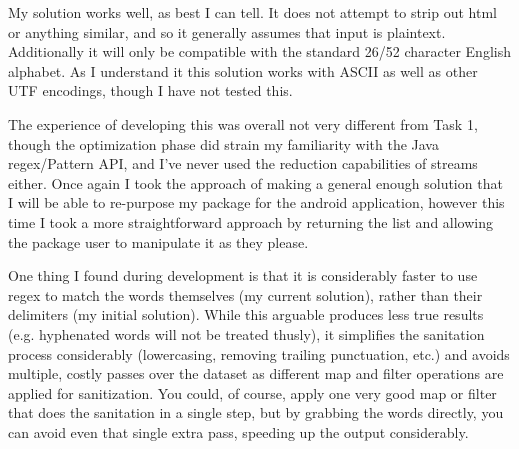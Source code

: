 \documentclass[11pt]{article}
\begin{document}
My solution works well, as best I can tell. It does not attempt to strip out html or anything similar, and so it generally assumes that input is plaintext. Additionally it will only be compatible with the standard 26/52 character English alphabet. As I understand it this solution works with ASCII as well as other UTF encodings, though I have not tested this.

The experience of developing this was overall not very different from Task 1, though the optimization phase did strain my familiarity with the Java regex/Pattern API, and I've never used the reduction capabilities of streams either. Once again I took the approach of making a general enough solution that I will be able to re-purpose my package for the android application, however this time I took a more straightforward approach by returning the list and allowing the package user to manipulate it as they please.

One thing I found during development is that it is considerably faster to use regex to match the words themselves (my current solution), rather than their delimiters (my initial solution). While this arguable produces less true results (e.g. hyphenated words will not be treated thusly), it simplifies the sanitation process considerably (lowercasing, removing trailing punctuation, etc.) and avoids multiple, costly passes over the dataset as different map and filter operations are applied for sanitization. You could, of course, apply one very good map or filter that does the sanitation in a single step, but by grabbing the words directly, you can avoid even that single extra pass, speeding up the output considerably.
\end{document}
